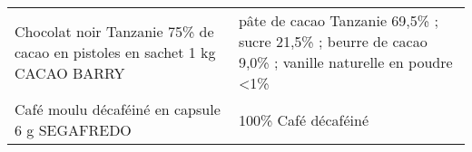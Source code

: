 \begin{longtable}{p{5cm}p{10cm}}
                               Chocolat noir Tanzanie 75\% de cacao en pistoles en sachet 1 kg CACAO BARRY &                                                                                                                                                                                                                                                                                                                                                                                                                                                                                                                                                                                                                                                                                                                                                                                                                                                                                                                                      pâte de cacao Tanzanie 69,5\% ; sucre 21,5\% ; beurre de cacao 9,0\% ; vanille naturelle en poudre <1\% \\
                                                            Café moulu décaféiné en capsule 6 g SEGAFREDO &                                                                                                                                                                                                                                                                                                                                                                                                                                                                                                                                                                                                                                                                                                                                                                                                                                                                                                                                                                                                                      100\% Café décaféiné \\

\end{longtable}
